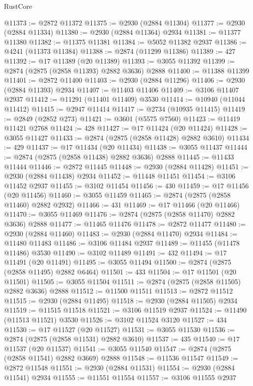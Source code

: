 \begin{lexlean}{RustCore}
\begin{coremodule}
@11373 := @2872 @11372
@11375 := @2930 (@2884 @11304)
@11377 := @2930 (@2884 @11334)
@11380 := @2930 (@2884 @11364) @2934
@11381 := @11377 @11380
@11382 := @11375 @11381
@11384 := @5052 @11382 @2937
@11386 := @4241 (@11373 @11384)
@11388 := @2874 (@11299 @11386)
@11389 := 427
@11392 := @17 @11389 (@20 @11389)
@11393 := @3055 @11392
@11399 := @2874 (@2875 (@2858 @11393) @2882 @3636) @2888
@11400 := @11388 @11399
@11401 := @2872 @11400
@11403 := @2930 (@2884 @11296)
@11406 := @2930 (@2884 @11393) @2934
@11407 := @11403 @11406
@11409 := @3106 @11407 @2937
@11412 := @11291 (@11401 @11409) @3530
@11414 := @10940 (@11044 @11412)
@11415 := @2947 @11414
@11417 := @2734 (@10935 @11415)
@11419 := @2849 (@2852 @273)
@11421 := @3601 (@5575 @7560)
@11423 := @11419 @11421 @2768
@11424 := 428
@11427 := @17 @11424 (@20 @11424)
@11428 := @3055 @11427
@11433 := @2874 (@2875 (@2858 @11428) @2882 @3610)
@11434 := 429
@11437 := @17 @11434 (@20 @11434)
@11438 := @3055 @11437
@11444 := @2874 (@2875 (@2858 @11438) @2882 @3636) @2888
@11445 := @11433 @11444
@11446 := @2872 @11445
@11448 := @2930 (@2884 @11428)
@11451 := @2930 (@2884 @11438) @2934
@11452 := @11448 @11451
@11454 := @3106 @11452 @2937
@11455 := @3102 @11454
@11456 := 430
@11459 := @17 @11456 (@20 @11456)
@11460 := @3055 @11459
@11465 := @2874 (@2875 (@2858 @11460) @2882 @2932)
@11466 := 431
@11469 := @17 @11466 (@20 @11466)
@11470 := @3055 @11469
@11476 := @2874 (@2875 (@2858 @11470) @2882 @3636) @2888
@11477 := @11465 @11476
@11478 := @2872 @11477
@11480 := @2930 (@2884 @11460)
@11483 := @2930 (@2884 @11470) @2934
@11484 := @11480 @11483
@11486 := @3106 @11484 @2937
@11489 := @11455 (@11478 @11486) @3530
@11490 := @3102 @11489
@11491 := 432
@11494 := @17 @11491 (@20 @11491)
@11495 := @3055 @11494
@11500 := @2874 (@2875 (@2858 @11495) @2882 @6464)
@11501 := 433
@11504 := @17 @11501 (@20 @11501)
@11505 := @3055 @11504
@11511 := @2874 (@2875 (@2858 @11505) @2882 @3636) @2888
@11512 := @11500 @11511
@11513 := @2872 @11512
@11515 := @2930 (@2884 @11495)
@11518 := @2930 (@2884 @11505) @2934
@11519 := @11515 @11518
@11521 := @3106 @11519 @2937
@11524 := @11490 (@11513 @11521) @3530
@11526 := @3102 @11524 @3120
@11527 := 434
@11530 := @17 @11527 (@20 @11527)
@11531 := @3055 @11530
@11536 := @2874 (@2875 (@2858 @11531) @2882 @3610)
@11537 := 435
@11540 := @17 @11537 (@20 @11537)
@11541 := @3055 @11540
@11547 := @2874 (@2875 (@2858 @11541) @2882 @3669) @2888
@11548 := @11536 @11547
@11549 := @2872 @11548
@11551 := @2930 (@2884 @11531)
@11554 := @2930 (@2884 @11541) @2934
@11555 := @11551 @11554
@11557 := @3106 @11555 @2937

\end{coremodule}
\end{lexlean}
